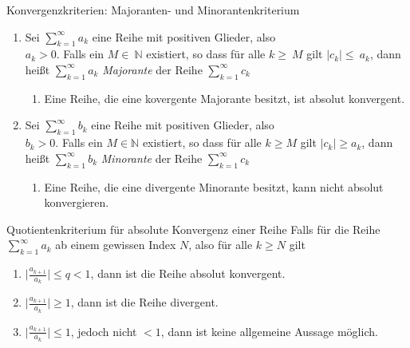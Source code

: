 \begin{karte}{Konvergenzkriterien: Majoranten- und Minorantenkriterium}
	\begin{enumerate}[label=\textbullet]
		
		\item Sei \(\sum_{k=1}^{\infty}a_k\) eine Reihe mit positiven Glieder, also \\ \( a_k > 0\). Falls ein \(M \in\ \mathbb{N}\) existiert, so dass für alle \(k \geq\ M\) gilt \(\lvert c_k\rvert \leq\ a_k\), dann heißt \(\sum_{k=1}^{\infty}a_k\) \emph{Majorante} der Reihe \(\sum_{k=1}^{\infty}c_k\)
		      \begin{enumerate}[label=\(\triangleright \)]
		      	\item Eine Reihe, die eine kovergente Majorante besitzt, ist absolut konvergent.
		      \end{enumerate}
		\item Sei \(\sum_{k=1}^{\infty}b_k\) eine Reihe mit positiven Glieder, also \\ \( b_k > 0\). Falls ein \(M \in \mathbb{N}\) existiert, so dass für alle \(k \geq M\) gilt \(\lvert c_k\rvert \geq a_k\), dann heißt \(\sum_{k=1}^{\infty}b_k\) \emph{Minorante} der Reihe \(\sum_{k=1}^{\infty}c_k\)
		      \begin{enumerate}[label=\(\triangleright \)]
		      	\item Eine Reihe, die eine divergente Minorante besitzt, kann nicht absolut konvergieren.
		      \end{enumerate}
		      
	\end{enumerate}
\end{karte}

\begin{karte}{Quotientenkriterium für absolute Konvergenz einer Reihe}
	Falls für die Reihe \(\sum_{k=1}^{\infty}a_k\) ab einem gewissen Index \(N\), also für alle \( k \geq N\) gilt
	\begin{enumerate}[label=\(\triangleright \)]
		
		\item \(\lvert \frac{a_{k+1}}{a_k}\rvert \leq q < 1\), dann ist die Reihe absolut konvergent.
		      
		\item \(\lvert \frac{a_{k+1}}{a_k}\rvert \geq  1\), dann ist die Reihe divergent.
		      
		\item \(\lvert \frac{a_{k+1}}{a_k}\rvert \leq  1\), jedoch nicht \(<1\), dann ist keine allgemeine Aussage möglich.
	\end{enumerate}
	
\end{karte}

